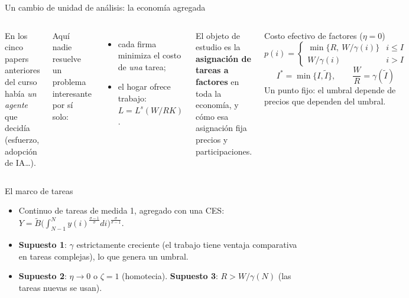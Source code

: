 \documentclass[aspectratio=169,10pt]{beamer}
\newcommand{\It}{\tilde I}
\newcommand{\Is}{I^{*}}
\begin{document}
\begin{frame}{Un cambio de unidad de análisis: la economía agregada}
\small
\begin{columns}[c]
En los cinco papers anteriores del curso había \emph{un agente} que decidía (esfuerzo, adopción de IA\ldots).

\medskip
Aquí nadie resuelve un problema interesante por sí solo:
\begin{itemize}
  \item cada firma minimiza el costo de \emph{una} tarea;
  \item el hogar ofrece trabajo: $L=L^s(W/RK)$.
\end{itemize}
El objeto de estudio es la \textbf{asignación de tareas a factores} en toda la economía, y cómo esa asignación fija precios y participaciones.
\begin{block}{Costo efectivo de factores ($\eta=0$)}
\[
  p(i)=\begin{cases}\min\{R,\ W/\gamma(i)\} & i\le I\\ W/\gamma(i) & i>I\end{cases}
\]
\[
  \Is=\min\{I,\It\},\qquad \frac WR=\gamma(\It)
\]
Un punto fijo: el umbral depende de precios que dependen del umbral.
\end{block}
\end{columns}
\end{frame}

\begin{frame}{El marco de tareas}
\centering
{}

\vspace{6pt}
\begin{itemize}\small
  \item Continuo de tareas de medida 1, agregado con una CES: $Y=\tilde B\big(\int_{N-1}^N y(i)^{\frac{\sigma-1}{\sigma}}di\big)^{\frac{\sigma}{\sigma-1}}$.
  \item \textbf{Supuesto 1}: $\gamma$ estrictamente creciente (el trabajo tiene ventaja comparativa en tareas complejas), lo que genera un umbral.
  \item \textbf{Supuesto 2}: $\eta\to0$ o $\zeta=1$ (homotecia). \textbf{Supuesto 3}: $R>W/\gamma(N)$ (las tareas nuevas se usan).
\end{itemize}
\end{frame}
\end{document}
